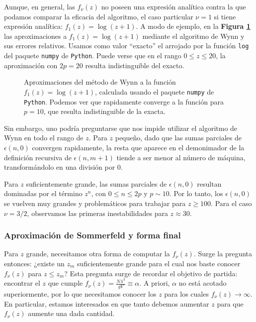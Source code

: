 Aunque, en general, las $f_\nu(z)$ no poseen una expresión analítica contra la que podamos comparar la eficacia del algoritmo, el caso particular $\nu=1$ si tiene 
expresión analítica: $f_1(z) = \log(z+1)$.
A modo de ejemplo, en la \textbf{Figura \ref{fig:ej_wynn_log}} las aproximaciones a $f_1(z) = \log(z+1)$ mediante el algoritmo de Wynn y sus errores relativos.
Usamos como valor ``exacto'' el arrojado por la función \texttt{log} del paquete \texttt{numpy} de \texttt{Python}.
Puede verse que en el rango $0\leq z\leq 20$, la aproximación con $2p=20$ resulta indistinguible del exacto.

\begin{figure}[H]
	\centering
	\hspace{0.05\columnwidth}
	\caption{Aproximaciones del método de Wynn a la función $f_1(z) = \log(z+1)$, calculada usando el paquete \texttt{numpy} de \texttt{Python}. 
	Podemos ver que rapidamente converge a la función para $p=10$, que resulta indistinguible de la exacta.}
	\label{fig:ej_wynn_log}
\end{figure}

Sin embargo, uno podría preguntarse que nos impide utilizar el algoritmo de Wynn en todo el rango de $z$.
Para $z$ pequeño, dado que las sumas parciales de $\epsilon(n,0)$ convergen rapidamente, la resta que aparece en el demonimador de la definición recursiva de 
$\epsilon(n, m+1)$ tiende a ser menor al número de máquina, transformándolo en una división por $0$.

Para $z$ suficientemente grande, las sumas parciales de $\epsilon(n,0)$ resultan dominadas por el término $z^n$, con $0\leq n\leq 2p$ y $p\sim 10$. 
Por lo tanto, los $\epsilon(n,0)$ se vuelven muy grandes y problemáticos para trabajar para $z\geq 100$. 
Para el caso $\nu=3/2$, observamos las primeras inestabilidades para $z\approx 30$.


\subsubsection{Aproximación de Sommerfeld y forma final}

Para $z$ grande, necesitamos otra forma de computar la $f_\nu(z)$.
Surge la pregunta entonces: ¿existe un $z_m$ suficientemente grande para el cual nos baste conocer $f_\nu(z)$ para $z\leq z_m$?
Esta pregunta surge de recordar el objetivo de partida: encontrar el $z$ que cumple $f_\nu(z)=\frac{N\lambda^3}{gV}\equiv \alpha$.
A priori, $\alpha$ no está acotado superiormente, por lo que necesitamos conocer los $z$ para los cuales $f_\nu(z)\to\infty$.
En particular, estamos interesados en que tanto debemos aumentar $z$ para que $f_\nu(z)$ aumente una dada cantidad.

